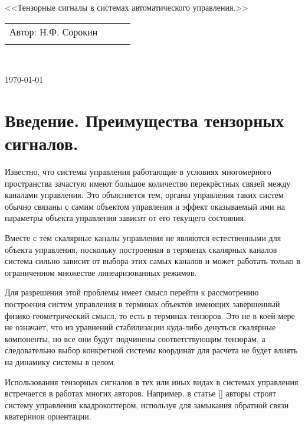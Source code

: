 \documentclass[a4paper]{article}
\begin{document}
\begin{center}
\hfill \break
\hfill\break
\hfill \break
\hfill \break
\hfill \break
\hfill \break
\hfill \break
\hfill \break
\hfill \break
\hfill \break
\large{<<Тензорные сигналы в системах автоматического управления.>>}\\
\hfill \break
\hfill \break
\hfill \break
\hfill \break
\hfill \break
\hfill \break
\hfill \break
\hfill \break
\end{center}
 
\normalsize{ 
\begin{tabular}{lccl}
Автор: Н.Ф. Сорокин\\\\
\end{tabular}
}\\
\hfill \break
\hfill \break
\hfill \break
\hfill \break
\hfill \break
\begin{center} \today \end{center}
\thispagestyle{empty} %
\newpage

\section{Введение. Преимущества тензорных сигналов.}

Известно, что системы управления работающие в условиях многомерного пространства зачастую имеют большое количество перекрёстных связей между каналами управления. Это объясняется тем, органы управления таких систем обычно связаны с самим объектом управления и эффект оказываемый ими на параметры объекта управления зависит от его текущего состояния.

Вместе с тем скалярные каналы управления не являются естественными для объекта управления, поскольку построенная в терминах скалярных каналов система сильно зависит от выбора этих самых каналов и может работать только в ограниченном множестве линеаризованных режимов.

Для разрешения этой проблемы имеет смысл перейти к рассмотрению построения систем управления в терминах объектов имеющих завершенный физико-геометрический смысл, то есть в терминах тензоров. Это не в коей мере не означает, что из уравнений стабилизации куда-либо денуться скалярные компоненты, но все они будут подчинены соответствующим тензорам, а следовательно выбор конкретной системы координат для расчета не будет влиять на динамику системы в целом. 

Использования тензорных сигналов в тех или иных видах в системах управления встречается в работах многих авторов. Например, в статье [] авторы строят систему управления квадрокоптером, используя для замыкания обратной связи кватернион ориентации. 
\end{document}

